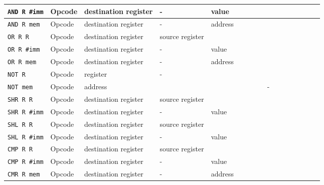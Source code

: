 \documentclass[10pt,a4paper]{scrartcl}
\newcommand{\code}[1]{\texttt{#1}}
\begin{document}
\begin{tabular}{|l|c|c|c|c|c|c|c|c|c|c|c|c|c|c|c|c|c|c|c|c|c|c|c|c|c|c|c|c|c|c|c|c|}
    \code{AND R \#imm} & \multicolumn{8}{|l|}{Opcode} & \multicolumn{4}{|l|}{destination register} & \multicolumn{4}{|l|}{-} & \multicolumn{16}{|l|}{value} \\ \hline
    \code{AND R mem} & \multicolumn{8}{|l|}{Opcode} & \multicolumn{4}{|l|}{destination register} & \multicolumn{4}{|l|}{-} & \multicolumn{16}{|l|}{address} \\ \hline
    \code{OR R R} & \multicolumn{8}{|l|}{Opcode} & \multicolumn{4}{|l|}{destination register} & \multicolumn{4}{|l|}{source register} \\ \hline
    \code{OR R \#imm} & \multicolumn{8}{|l|}{Opcode} & \multicolumn{4}{|l|}{destination register} & \multicolumn{4}{|l|}{-} & \multicolumn{16}{|l|}{value} \\ \hline
    \code{OR R mem} & \multicolumn{8}{|l|}{Opcode} & \multicolumn{4}{|l|}{destination register} & \multicolumn{4}{|l|}{-} & \multicolumn{16}{|l|}{address} \\ \hline
    \code{NOT R} & \multicolumn{8}{|l|}{Opcode} & \multicolumn{4}{|l|}{register} & \multicolumn{20}{|l|}{-} \\ \hline
    \code{NOT mem} & \multicolumn{8}{|l|}{Opcode} & \multicolumn{16}{|l|}{address} & \multicolumn{8}{|l|}{-} \\ \hline
    \code{SHR R R} & \multicolumn{8}{|l|}{Opcode} & \multicolumn{4}{|l|}{destination register} & \multicolumn{4}{|l|}{source register} \\ \hline
    \code{SHR R \#imm} & \multicolumn{8}{|l|}{Opcode} & \multicolumn{4}{|l|}{destination register} & \multicolumn{4}{|l|}{-} & \multicolumn{16}{|l|}{value} \\ \hline
    \code{SHL R R}  & \multicolumn{8}{|l|}{Opcode} & \multicolumn{4}{|l|}{destination register} & \multicolumn{4}{|l|}{source register} \\ \hline
    \code{SHL R \#imm} & \multicolumn{8}{|l|}{Opcode} & \multicolumn{4}{|l|}{destination register} & \multicolumn{4}{|l|}{-} & \multicolumn{16}{|l|}{value} \\ \hline
    \code{CMP R R} & \multicolumn{8}{|l|}{Opcode} & \multicolumn{4}{|l|}{destination register} & \multicolumn{4}{|l|}{source register} \\ \hline
    \code{CMP R \#imm} & \multicolumn{8}{|l|}{Opcode} & \multicolumn{4}{|l|}{destination register} & \multicolumn{4}{|l|}{-} & \multicolumn{16}{|l|}{value} \\ \hline
    \code{CMR R mem} & \multicolumn{8}{|l|}{Opcode} & \multicolumn{4}{|l|}{destination register} & \multicolumn{4}{|l|}{-} & \multicolumn{16}{|l|}{address} \\ \hline

\end{tabular}
\end{document}
